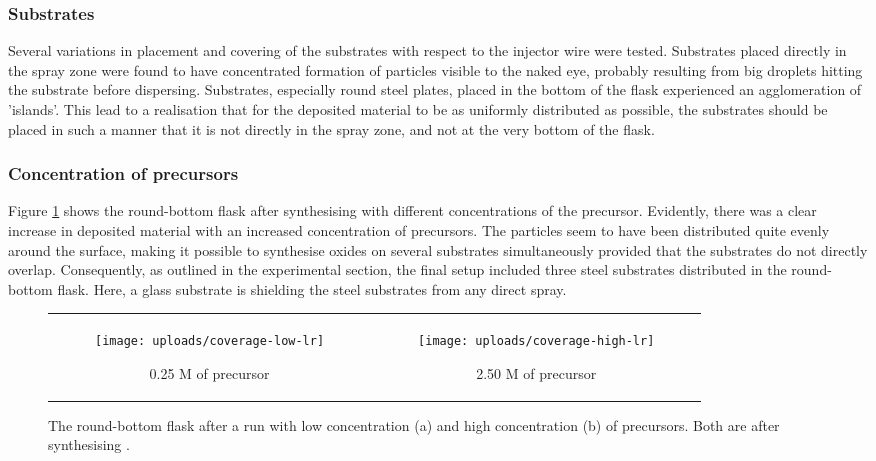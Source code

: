 \documentclass[Main/main.tex]{subfiles}
\begin{document}
\subsubsection{Substrates}

Several variations in placement and covering of the substrates with respect to the injector wire were tested. Substrates placed directly in the spray zone were found to have concentrated formation of particles visible to the naked eye, probably resulting from big droplets hitting the substrate before dispersing. Substrates, especially round steel plates, placed in the bottom of the flask experienced an agglomeration of 'islands'. This lead to a realisation that for the deposited material to be as uniformly distributed as possible, the substrates should be placed in such a manner that it is not directly in the spray zone, and not at the very bottom of the flask.
 
 \subsubsection{Concentration of precursors}
 Figure \ref{fig:coverage} shows the round-bottom flask after synthesising  with different concentrations of the precursor. Evidently, there was a clear increase in deposited material with an increased concentration of precursors. The particles seem to have been distributed quite evenly around the surface, making it possible to synthesise oxides on several substrates simultaneously provided that the substrates do not directly overlap. Consequently, as outlined in the experimental section, the final setup included three steel substrates distributed in the round-bottom flask. Here, a glass substrate is shielding the steel substrates from any direct spray.

 
 \begin{figure}[ht]
 \centering
     \begin{tabular}{c c}
     \begin{subfigure}[r]{0.45\textwidth}
     \qquad \qquad \texttt{[image: uploads/coverage-low-lr]}
     \caption{0.25 M of precursor}
     \end{subfigure}
     &
     \begin{subfigure}[l]{0.45\textwidth}
     \texttt{[image: uploads/coverage-high-lr]}
     \caption{2.50 M of precursor}
     \end{subfigure}
     \end{tabular}
     \caption{The round-bottom flask after a run with low concentration (a) and high concentration (b) of precursors. Both are after synthesising .}
     \label{fig:coverage}
 \end{figure}
\end{document}
